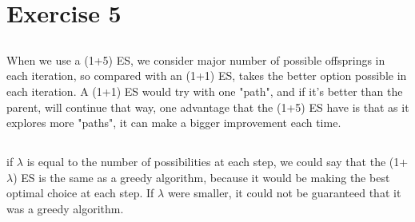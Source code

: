 \documentclass{scrartcl}
\begin{document}
\section{Exercise 5}
\subsection{}
When we use a (1+5) ES, we consider major number of possible offsprings in each iteration, so compared with an (1+1) ES, takes the better option possible in each iteration. A (1+1) ES would try with one "path", and if it's better than the parent, will continue that way, one advantage that the (1+5) ES have is that as it explores more "paths", it can make a bigger improvement each time.
\subsection{}
if $\lambda $ is equal to the number of possibilities at each step, we could say that the (1+$\lambda$) ES is the same as a greedy algorithm, because it would be making the best optimal choice at each step. If $\lambda$ were smaller, it could not be guaranteed that it was a greedy algorithm.
\end{document}
